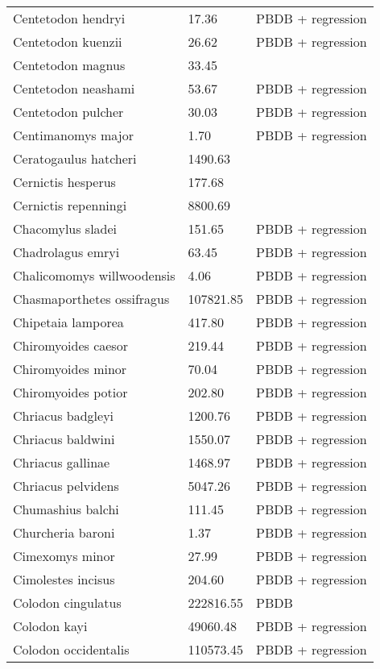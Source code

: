 \documentclass{article}
\begin{document}
\begin{center}
\begin{longtable}{p{} p{} p{}}
    Centetodon hendryi & 17.36 & PBDB + regression \\ 
    Centetodon kuenzii & 26.62 & PBDB + regression \\ 
    Centetodon magnus & 33.45 & \cite{Tomiya2013} \\ 
    Centetodon neashami & 53.67 & PBDB + regression \\ 
    Centetodon pulcher & 30.03 & PBDB + regression \\ 
    Centimanomys major & 1.70 & PBDB + regression \\ 
    Ceratogaulus hatcheri & 1490.63 & \cite{Cassiliano2008} \\ 
    Cernictis hesperus & 177.68 & \cite{Tomiya2013} \\ 
    Cernictis repenningi & 8800.69 & \cite{Hall1930} \\ 
    Chacomylus sladei & 151.65 & PBDB + regression \\ 
    Chadrolagus emryi & 63.45 & PBDB + regression \\ 
    Chalicomomys willwoodensis & 4.06 & PBDB + regression \\ 
    Chasmaporthetes ossifragus & 107821.85 & PBDB + regression \\ 
    Chipetaia lamporea & 417.80 & PBDB + regression \\ 
    Chiromyoides caesor & 219.44 & PBDB + regression \\ 
    Chiromyoides minor & 70.04 & PBDB + regression \\ 
    Chiromyoides potior & 202.80 & PBDB + regression \\ 
    Chriacus badgleyi & 1200.76 & PBDB + regression \\ 
    Chriacus baldwini & 1550.07 & PBDB + regression \\ 
    Chriacus gallinae & 1468.97 & PBDB + regression \\ 
    Chriacus pelvidens & 5047.26 & PBDB + regression \\ 
    Chumashius balchi & 111.45 & PBDB + regression \\ 
    Churcheria baroni & 1.37 & PBDB + regression \\ 
    Cimexomys minor & 27.99 & PBDB + regression \\ 
    Cimolestes incisus & 204.60 & PBDB + regression \\ 
    Colodon cingulatus & 222816.55 & PBDB \\ 
    Colodon kayi & 49060.48 & PBDB + regression \\ 
    Colodon occidentalis & 110573.45 & PBDB + regression \\ 

\end{longtable}
\end{center}
\end{document}
